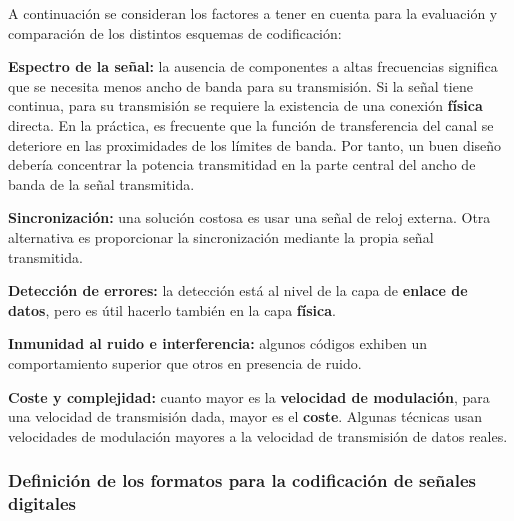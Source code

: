 \documentclass[10pt,a4paper]{article}
\begin{document}
A continuación se consideran los factores a tener en cuenta para la evaluación y comparación de los distintos esquemas de codificación:
\begin{description}
\item \textbf{Espectro de la señal:} la ausencia de componentes a altas frecuencias significa que se necesita menos ancho de banda para su transmisión. Si la señal tiene continua, para su transmisión se requiere la existencia de una conexión \textbf{física} directa. En la práctica, es frecuente que la función de transferencia del canal se deteriore en las proximidades de los límites de banda. Por tanto, un buen diseño debería concentrar la potencia transmitidad en la parte central del ancho de banda de la señal transmitida.
\item \textbf{Sincronización:} una solución costosa es usar una señal de reloj externa. Otra alternativa es proporcionar la sincronización mediante la propia señal transmitida.
\item \textbf{Detección de errores:} la detección está al nivel de la capa de \textbf{enlace de datos}, pero es útil hacerlo también en la capa \textbf{física}.
\item \textbf{Inmunidad al ruido e interferencia:} algunos códigos exhiben un comportamiento superior que otros en presencia de ruido.
\item \textbf{Coste y complejidad:} cuanto mayor es la \textbf{velocidad de modulación}, para una velocidad de transmisión dada, mayor es el  \textbf{coste}. Algunas técnicas usan velocidades de modulación mayores  a la velocidad de transmisión de datos reales.
\end{description}

\subsubsection{Definición de los formatos para la codificación de señales digitales}
\end{document}
